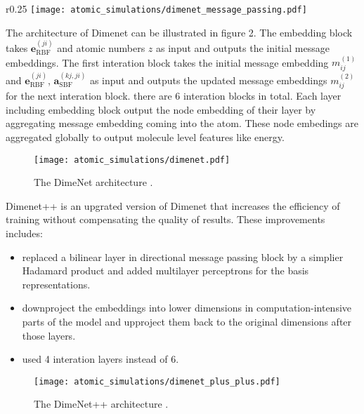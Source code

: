 \begin{wrapfigure}{r}{0.25\textwidth}
    \centering
    \texttt{[image: atomic\_simulations/dimenet\_message\_passing.pdf]}
  \end{wrapfigure}
The architecture of Dimenet can be illustrated in figure 2. 
The embedding block takes $\boldsymbol{e}_{\mathrm{RBF}}^{(j i)}$ and 
atomic numbers $z$ as input and outputs the initial message embeddings. 
The first interation block takes the initial message embedding $m_{ij}^{(1)}$ 
and $\boldsymbol{e}_{\mathrm{RBF}}^{(j i)}$, $\boldsymbol{a}_{\mathrm{SBF}}^{(k j, j i)}$ 
as input and outputs the updated message embeddings $m_{ij}^{(2)}$ for the next interation 
block. there are 6 interation blocks in total. Each layer including embedding block output 
the node embedding of their layer by aggregating message embedding coming into the atom. 
These node embedings are aggregated globally to output molecule level features like energy.\\

\begin{figure}[H]
    \centering
    \texttt{[image: atomic\_simulations/dimenet.pdf]}
    \caption{The DimeNet architecture \cite*{DBLP:journals/corr/abs-2003-03123}.}
\end{figure}

Dimenet++ is an upgrated version of Dimenet that increases the efficiency of training 
without compensating the quality of results. These improvements includes: \\
\begin{itemize}
    \item replaced a bilinear layer in directional message passing block by a 
    simplier Hadamard product and added multilayer perceptrons for the basis representations.
    \item downproject the embeddings into lower dimensions in computation-intensive 
    parts of the model and upproject them back to the original dimensions after those layers.
    \item used 4 interation layers instead of 6. 
\end{itemize}

\begin{figure}[H]
  \centering
\texttt{[image: atomic\_simulations/dimenet\_plus\_plus.pdf]}
\caption{The DimeNet++ architecture \cite*{https://doi.org/10.48550/arxiv.2203.09697}.}
\label{fig:one}
\end{figure}
